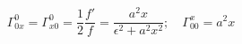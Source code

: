 \begin{equation}
   \Gamma^0_{0x} = \Gamma^0_{x0} = \frac{1}{2} \frac{f'}{f} = \frac{a^2 x}{\epsilon^2 + a^2 x^2}; \quad
   \Gamma^x_{00} = a^2 x
   \label{thegammas}
   \end{equation}

